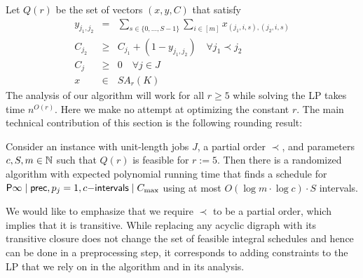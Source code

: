 Let $Q(r)$ be the set of vectors $(x,y,C)$ that satisfy
\begin{eqnarray*}
  y_{j_1,j_2} &=& \sum_{s \in \{ 0,\ldots,S-1\}} \sum_{i \in [m]} x_{(j_1,i,s),(j_2,i,s)} \\
  C_{j_2} &\geq& C_{j_1} + (1-y_{j_1,j_2}) \quad \forall j_1 \prec j_2 \\
  C_j &\geq& 0 \quad \forall j \in J \\ 
  x &\in& SA_r(K)
\end{eqnarray*}
The analysis of our algorithm will work for all $r \geq 5$ while solving the LP takes time $n^{O(r)}$.
Here we make no attempt at optimizing the constant $r$.
The main technical contribution of this section is the following rounding result: 
\begin{theorem} \label{thm:LPRoundingTheorem}
Consider an instance with unit-length jobs $J$, a partial order $\prec$, and parameters $c,S,m \in \mathbb{N}$ such that
  $Q(r)$ is feasible for $r:=5$. Then there is a randomized algorithm with expected polynomial running time that finds a
   schedule for $\mathsf{P} \infty \mid \mathsf{prec}, p_j=1, c\mathsf{-intervals} \mid C_{\max}$ using at most $O(\log m \cdot \log c) \cdot S$ intervals.
\end{theorem}
We would like to emphasize that we require $\prec$ to be a partial order, which implies that it
is transitive. While replacing any acyclic digraph with its transitive closure  does not change the set of feasible integral
schedules and hence can be done in a preprocessing step, it corresponds to adding constraints to the LP that we
rely on in the algorithm and in its analysis.

